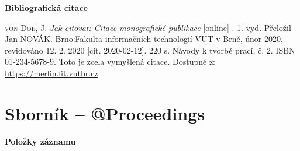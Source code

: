 \bigskip

\noindent \textbf{Bibliografická citace}

\medskip

\noindent \textsc{von Doe}, J. \textit{Jak citovat: Citace monografické publikace} [online] . 1. vyd. Přeložil Jan NOVÁK.
Brno:Fakulta informačních technologií VUT v Brně, únor 2020, revidováno 12. 2. 2020 [cit. 2020-02-12]. 220 s. Návody k tvorbě prací, č. 2. ISBN 01-234-5678-9. Toto je zcela vymyšlená citace. Dostupné z: \url{https://merlin.fit.vutbr.cz}
\newpage
\section*{Sborník -- @Proceedings}
\label{pr-sbornik}
\noindent \textbf{Položky záznamu}

\medskip

